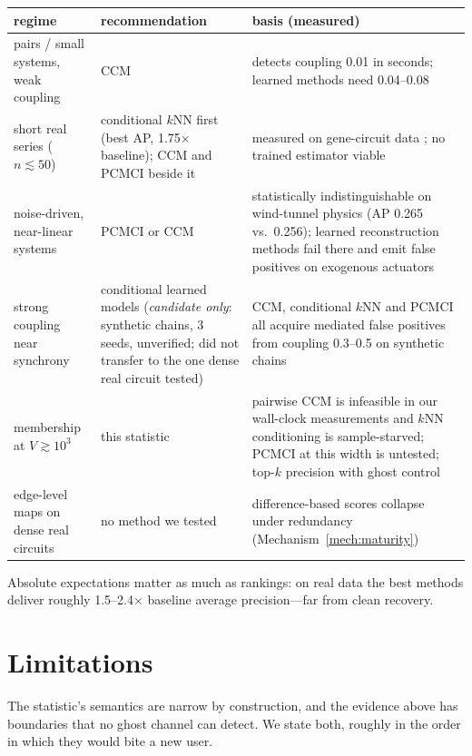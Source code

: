 \documentclass[11pt]{article}
\begin{document}
\begin{center}
\small
\begin{tabular}{p{5.2cm}p{4.2cm}p{5.2cm}}
\toprule
regime & recommendation & basis (measured)\\
\midrule
pairs / small systems, weak coupling & CCM & detects coupling 0.01 in
seconds; learned methods need 0.04--0.08\\
short real series ($n \lesssim 50$) & conditional $k$NN first (best AP,
1.75$\times$ baseline); CCM and PCMCI beside it & measured on gene-circuit
data \citep{hughes2009}; no trained estimator viable\\
noise-driven, near-linear systems & PCMCI or CCM & statistically
indistinguishable on wind-tunnel physics \citep{gamella2025} (AP 0.265
vs.\ 0.256); learned reconstruction methods fail there and emit false positives
on exogenous actuators\\
strong coupling near synchrony & conditional learned models
(\emph{candidate only}: synthetic chains, 3 seeds, unverified; did not
transfer to the one dense real circuit tested) & CCM, conditional $k$NN and
PCMCI all acquire mediated false positives from coupling 0.3--0.5 on
synthetic chains\\
membership at $V \gtrsim 10^3$ & this statistic & pairwise CCM is
infeasible in our wall-clock measurements and $k$NN conditioning is
sample-starved; PCMCI at this width is
untested; top-$k$ precision with ghost control\\
edge-level maps on dense real circuits & no method we tested &
difference-based scores collapse under redundancy
(Mechanism~\ref{mech:maturity})\\
\bottomrule
\end{tabular}
\end{center}

\noindent Absolute expectations matter as much as rankings: on real data
the best methods deliver roughly 1.5--2.4$\times$ baseline average
precision---far from clean recovery.

\section{Limitations}
\label{sec:limits}

The statistic's semantics are narrow by construction, and the evidence above has boundaries that no ghost channel can detect. We state both, roughly in the order in which they would bite a new user.
\end{document}
